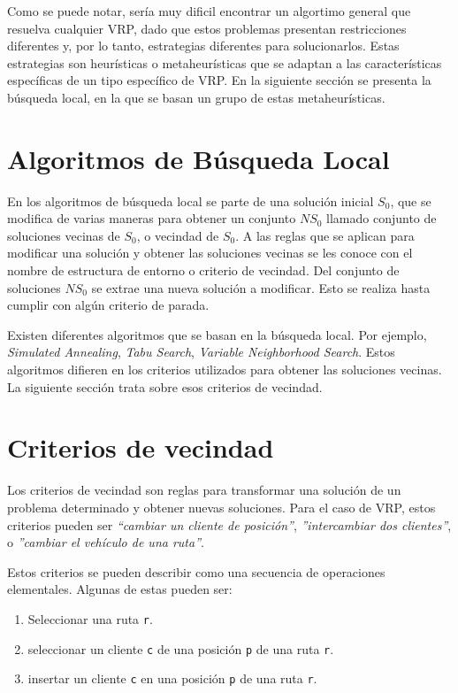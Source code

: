 Como se puede notar, sería muy dificil encontrar un algortimo general que resuelva cualquier VRP, dado que estos problemas presentan restricciones diferentes y, por lo tanto, estrategias diferentes para solucionarlos. Estas estrategias son heurísticas o metaheurísticas que se adaptan a las características específicas de un tipo específico de VRP. En la siguiente sección se presenta la búsqueda local, en la que se basan un grupo de estas metaheurísticas.


\section{Algoritmos de Búsqueda Local}\label{2-LocalSearch}

En los algoritmos de búsqueda local se parte de una solución inicial $S_{0}$, que se modifica de varias maneras para obtener un conjunto $NS_{0}$ llamado conjunto de soluciones vecinas de $S_{0}$, o vecindad de $S_{0}$\cite{JJ}. A las reglas que se aplican para modificar una solución y obtener las soluciones vecinas se les conoce con el nombre de estructura de entorno o criterio de vecindad\cite{JJ}. Del conjunto de soluciones $NS_{0}$ se extrae una nueva solución a modificar. Esto se realiza hasta cumplir con algún criterio de parada.

Existen diferentes algoritmos que se basan en la búsqueda local. Por ejemplo, \textit{Simulated Annealing}\cite{Liu}, \textit{Tabu Search}\cite{Taillard1997}, \textit{Variable Neighborhood Search}\cite{Camila}. Estos algoritmos difieren en los criterios utilizados para obtener las soluciones vecinas. La siguiente sección trata sobre esos criterios de vecindad.

\section{Criterios de vecindad}\label{3-Criterias}

Los criterios de vecindad son reglas para transformar una solución de un problema determinado y obtener nuevas soluciones. Para el caso de VRP, estos criterios pueden ser \textit{``cambiar un cliente de posición''}, \textit{''intercambiar dos clientes''}, o \textit{''cambiar el vehículo de una ruta''}.

Estos criterios se pueden describir como una secuencia de operaciones elementales. Algunas de estas pueden ser:

\begin{enumerate}
	\item Seleccionar una ruta \texttt{r}. 
	\item seleccionar un cliente \texttt{c} de una posición \texttt{p} de una ruta \texttt{r}.
	\item insertar un cliente \texttt{c} en una posición \texttt{p} de una ruta \texttt{r}.
\end{enumerate}

